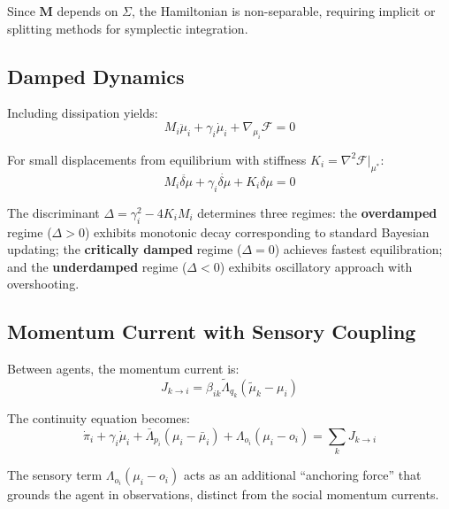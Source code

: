 \documentclass[12pt]{article}
\begin{document}
Since $\mathbf{M}$ depends on $\Sigma$, the Hamiltonian is non-separable, requiring implicit or splitting methods for symplectic integration.

\subsection{Damped Dynamics}

Including dissipation yields:
\begin{equation}
M_i\ddot{\mu}_i + \gamma_i\dot{\mu}_i + \nabla_{\mu_i}\mathcal{F} = 0
\label{eq:damped_dynamics}
\end{equation}

For small displacements from equilibrium with stiffness $K_i = \nabla^2\mathcal{F}|_{\mu^*}$:
\begin{equation}
M_i\ddot{\delta\mu} + \gamma_i\dot{\delta\mu} + K_i\delta\mu = 0
\end{equation}

The discriminant $\Delta = \gamma_i^2 - 4K_iM_i$ determines three regimes: the \textbf{overdamped} regime ($\Delta > 0$) exhibits monotonic decay corresponding to standard Bayesian updating; the \textbf{critically damped} regime ($\Delta = 0$) achieves fastest equilibration; and the \textbf{underdamped} regime ($\Delta < 0$) exhibits oscillatory approach with overshooting.

\subsection{Momentum Current with Sensory Coupling}

Between agents, the momentum current is:
\begin{equation}
J_{k \to i} = \beta_{ik}\tilde{\Lambda}_{q_k}(\tilde{\mu}_k - \mu_i)
\end{equation}

The continuity equation becomes:
\begin{equation}
\dot{\pi}_i + \gamma_i\dot{\mu}_i + \bar{\Lambda}_{p_i}(\mu_i - \bar{\mu}_i) + \Lambda_{o_i}(\mu_i - o_i) = \sum_k J_{k \to i}
\end{equation}

The sensory term $\Lambda_{o_i}(\mu_i - o_i)$ acts as an additional ``anchoring force'' that grounds the agent in observations, distinct from the social momentum currents.
\end{document}
